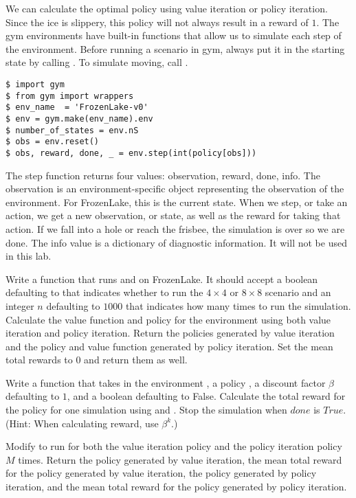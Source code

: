 We can calculate the optimal policy using value iteration or policy iteration.
Since the ice is slippery, this policy will not always result in a reward of $1$.
The gym environments have built-in functions that allow us to simulate each step of the environment.
Before running a scenario in gym, always put it in the starting state by calling .
To simulate moving, call .

\begin{lstlisting}
$ import gym
$ from gym import wrappers
$ env_name  = 'FrozenLake-v0'
$ env = gym.make(env_name).env
$ number_of_states = env.nS
$ obs = env.reset()
$ obs, reward, done, _ = env.step(int(policy[obs]))
\end{lstlisting}


The step function returns four values: observation, reward, done, info.
The observation is an environment-specific object representing the observation of the environment.
For FrozenLake, this is the current state.
When we step, or take an action, we get a new observation, or state, as well as the reward for taking that action.
If we fall into a hole or reach the frisbee, the simulation is over so we are done.
The info value is a dictionary of diagnostic information.
It will not be used in this lab.


\begin{problem}
\label{prob:policyiter-value5}
Write a function that runs  and  on FrozenLake.
It should accept a boolean  defaulting to  that indicates whether to run the $4\times 4$ or $8\times 8$ scenario and an integer $n$ defaulting to $1000$ that indicates how many times to run the simulation.
Calculate the value function and policy for the environment using both value iteration and policy iteration.
Return the policies generated by value iteration and the policy and value function generated by policy iteration.
Set the mean total rewards to $0$ and return them as well.
\end{problem}

\begin{problem}
\label{prob:policyiter-value6}
Write a function  that takes in the environment , a policy , a discount factor $\beta$ defaulting to $1$, and a boolean  defaulting to False.
Calculate the total reward for the policy for one simulation using  and .
Stop the simulation when $done$ is $True$.
(Hint: When calculating reward, use $\beta^k$.)

Modify  to run  for both the value iteration policy and the policy iteration policy $M$ times.
Return the policy generated by value iteration, the mean total reward for the policy generated by value iteration, the policy generated by policy iteration, and the mean total reward for the policy generated by policy iteration.
\end{problem}



